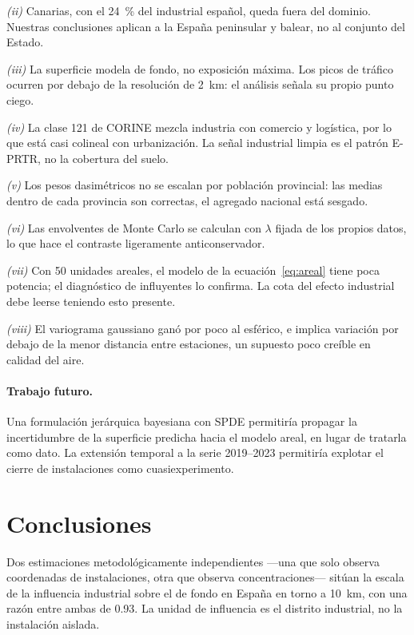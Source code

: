 \documentclass[10pt,twocolumn,a4paper]{article}
\begin{document}
\emph{(ii)} Canarias, con el \SI{24}{\percent} del  industrial
español, queda fuera del dominio. Nuestras conclusiones aplican a la España
peninsular y balear, no al conjunto del Estado.

\emph{(iii)} La superficie modela  de fondo, no exposición máxima. Los
picos de tráfico ocurren por debajo de la resolución de \SI{2}{\kilo\metre}:
el análisis señala su propio punto ciego.

\emph{(iv)} La clase 121 de CORINE mezcla industria con comercio y logística,
por lo que está casi colineal con urbanización. La señal industrial limpia es
el patrón E-PRTR, no la cobertura del suelo.

\emph{(v)} Los pesos dasimétricos no se escalan por población provincial: las
medias dentro de cada provincia son correctas, el agregado nacional está
sesgado.

\emph{(vi)} Las envolventes de Monte Carlo se calculan con $\lambda$ fijada de
los propios datos, lo que hace el contraste ligeramente anticonservador.

\emph{(vii)} Con \num{50} unidades areales, el modelo de la
ecuación~\eqref{eq:areal} tiene poca potencia; el diagnóstico de influyentes
lo confirma. La cota del efecto industrial debe leerse teniendo esto presente.

\emph{(viii)} El variograma gaussiano ganó por poco al esférico, e implica
variación por debajo de la menor distancia entre estaciones, un supuesto poco
creíble en calidad del aire.

\paragraph{Trabajo futuro.} Una formulación jerárquica bayesiana con SPDE
\citep{lindgren2011} permitiría propagar la incertidumbre de la superficie
predicha hacia el modelo areal, en lugar de tratarla como dato. La extensión
temporal a la serie 2019--2023 permitiría explotar el cierre de instalaciones
como cuasiexperimento.

\section{Conclusiones}

Dos estimaciones metodológicamente independientes ---una que solo observa
coordenadas de instalaciones, otra que observa concentraciones--- sitúan la
escala de la influencia industrial sobre el  de fondo en España en
torno a \SI{10}{\kilo\metre}, con una razón entre ambas de \num{0.93}. La
unidad de influencia es el distrito industrial, no la instalación aislada.
\end{document}
